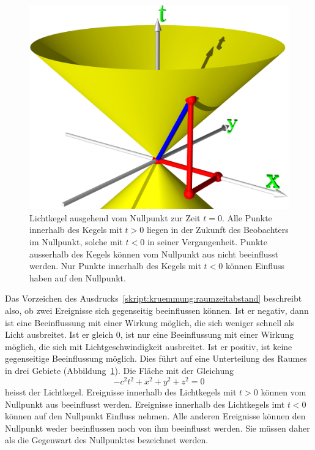 \begin{figure}
\centering
\includegraphics[width=\hsize]{chapters/3d/lichtkegel.jpg}
\caption{Lichtkegel ausgehend vom Nullpunkt zur Zeit $t=0$.
Alle Punkte innerhalb des Kegels mit $t>0$ liegen in der Zukunft des
Beobachters im Nullpunkt, solche mit $t<0$ in seiner Vergangenheit.
Punkte ausserhalb des Kegels können vom Nullpunkt aus nicht
beeinflusst werden.
Nur Punkte innerhalb des Kegels mit $t<0$ können Einfluss haben
auf den Nullpunkt.
\label{skript:kruemmung:fig:lichtkegel}}
\end{figure}

Das Vorzeichen des Ausdrucks~\eqref{skript:kruemmung:raumzeitabstand}
beschreibt also, ob zwei Ereignisse sich gegenseitig beeinflussen
können. 
Ist er negativ, dann ist eine Beeinflussung mit einer Wirkung möglich,
die sich weniger schnell als Licht ausbreitet.
Ist er gleich $0$, ist nur eine Beeinflussung mit einer Wirkung möglich,
die sich mit Lichtgeschwindigkeit ausbreitet.
Ist er positiv, ist keine gegenseitige Beeinflussung möglich.
Dies führt auf eine Unterteilung des Raumes in drei Gebiete
(Abbildung~\ref{skript:kruemmung:fig:lichtkegel}).
Die Fläche mit der Gleichung
\[
-c^2t^2+x^2+y^2+z^2=0
\]
heisst der Lichtkegel.
Ereignisse innerhalb des Lichtkegels mit $t>0$ können vom Nullpunkt aus
beeinflusst werden.
Ereignisse innerhalb des Lichtkegels imt $t<0$ können auf den Nullpunkt
Einfluss nehmen.
Alle anderen Ereignisse können den Nullpunkt weder beeinflussen
noch von ihm beeinflusst werden.
Sie müssen daher als die Gegenwart des Nullpunktes bezeichnet
werden.

